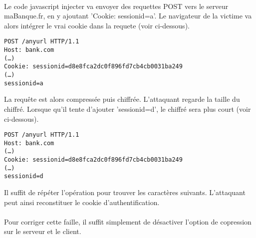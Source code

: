 \paragraph{}
Le code javascript injecter va envoyer des requettes POST vers le serveur maBanque.fr, en y ajoutant 'Cookie: sessionid=a'. Le navigateur de la victime va alors intégrer le vrai cookie dans la requete (voir ci-dessous).


\begin{verbatim}
POST /anyurl HTTP/1.1
Host: bank.com
(…)
Cookie: sessionid=d8e8fca2dc0f896fd7cb4cb0031ba249
(…)
sessionid=a
\end{verbatim}


La requête est alors compressée puis chiffrée. L'attaquant regarde la taille du chiffré.
Lorsque qu'il tente d'ajouter 'sessionid=d', le chiffré sera plus court (voir ci-dessous). 


\begin{verbatim}
POST /anyurl HTTP/1.1
Host: bank.com
(…)
Cookie: sessionid=d8e8fca2dc0f896fd7cb4cb0031ba249
(…)
sessionid=d
\end{verbatim}

Il suffit de répéter l'opération pour trouver les caractères suivants. L'attaquant peut ainsi reconstituer le cookie d'authentification.

\paragraph{}
Pour corriger cette faille, il suffit simplement de désactiver l'option de copression sur le serveur et le client.
